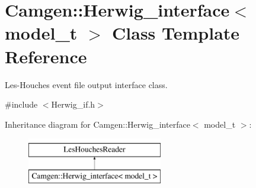 \hypertarget{a00283}{}\section{Camgen\+:\+:Herwig\+\_\+interface$<$ model\+\_\+t $>$ Class Template Reference}
\label{a00283}


Les-\/\+Houches event file output interface class.  




{\ttfamily \#include $<$Herwig\+\_\+if.\+h$>$}

Inheritance diagram for Camgen\+:\+:Herwig\+\_\+interface$<$ model\+\_\+t $>$\+:\begin{figure}[H]
\begin{center}
\leavevmode
\includegraphics[height=2.000000cm]{a00283}
\end{center}
\end{figure}
